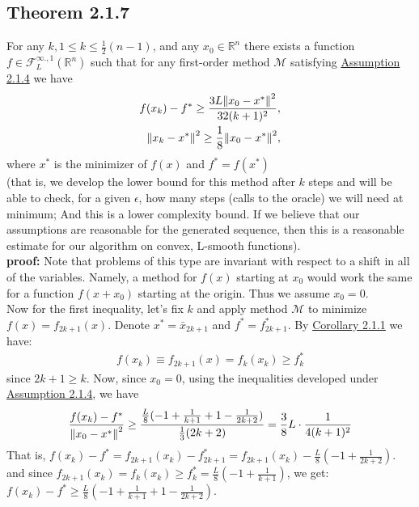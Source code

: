\documentclass[12pt,a4paper]{article}
\begin{document}
	\subsection*{Theorem 2.1.7}\label{thm217}
	For any $k, 1 \leq k \leq \frac{1}{2}(n-1)$, and any $x_0 \in \mathbb{R}^n$ there exists a function $f \in \mathcal{F}_L^{\infty., 1}(\mathbb{R}^n)$ such that for any first-order method $\mathcal{M}$ satisfying \hyperref[A214]{Assumption 2.1.4} we have
	\begin{align*}
		f(x_k) - f^* \geq \frac{3L\norm{x_0 - x^*}^2}{32(k+1)^2}, \\
		\norm{x_k - x^*}^2 \geq \frac{1}{8}\norm{x_0 - x^*}^2,
	\end{align*}
	where $x^*$ is the minimizer of $f(x)$ and $f^* = f(x^*)$\\
	(that is, we develop the lower bound for this method after $k$ steps and will be able to check, for a given $\epsilon$, how many steps (calls to the oracle) we will need at minimum; And this is a lower complexity bound. If we believe that our assumptions are reasonable for the generated sequence, then this is a reasonable estimate for our algorithm on convex, L-smooth functions).\\
	\textbf{proof:} Note that problems of this type are invariant with respect to a shift in all of the variables. Namely, a method for $f(x)$ starting at $x_0$ would work the same for a function $f(x + x_0)$ starting at the origin. Thus we assume $x_0 = 0$. \\
	Now for the first inequality, let's fix $k$ and apply method $\mathcal{M}$ to minimize $f(x) = f_{2k+1}(x)$. Denote $x^* = \bar{x}_{2k+1}$ and $f^* = f^*_{2k+1}$. By \hyperref[cor211]{Corollary 2.1.1} we have:
	\begin{align*}
		f(x_k) \equiv f_{2k+1}(x) = f_k(x_k)\geq f_k^*
	\end{align*}
	since $2k+1 \geq k$. Now, since $x_0 = 0$, using the inequalities developed under \hyperref[A214]{Assumption 2.1.4}, we have
	\begin{align*}
		\frac{f(x_k) - f^*}{\norm{x_0 - x^*}^2} \geq \frac{\frac{L}{8}(-1 + \frac{1}{k+1} + 1 - \frac{1}{2k+2})}{\frac{1}{3}(2k+2)} = \frac{3}{8}L \cdot \frac{1}{4(k+1)^2}
	\end{align*}
	That is, $f(x_k) - f^* = f_{2k+1}(x_k) - f^*_{2k+1}  = f_{2k+1}(x_k) - \frac{L}{8}(-1 + \frac{1}{2k+2})$. and since $f_{2k+1}(x_k) = f_k(x_k) \geq f^*_k = \frac{L}{8}(-1 + \frac{1}{k+1})$, we get:\\
	 $f(x_k) - f^* \geq \frac{L}{8}(-1 + \frac{1}{k+1} + 1 - \frac{1}{2k+2})$.\\
\end{document}
